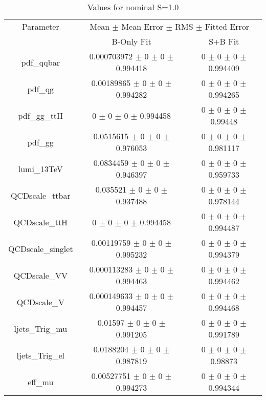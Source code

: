 \begin{table}
\centering
\caption{Values for nominal S=1.0}
\begin{tabular}{ccc}
\toprule
Parameter & \multicolumn{2}{c}{Mean $\pm$ Mean Error $\pm$ RMS $\pm$ Fitted Error}\\
 & B-Only Fit & S+B Fit\\
\midrule
pdf\_qqbar & \num{0.000703972} $\pm$ \num{0} $\pm$ \num{0} $\pm$ \num{0.994418} & \num{0} $\pm$ \num{0} $\pm$ \num{0} $\pm$ \num{0.994409}\\
pdf\_qg & \num{0.00189865} $\pm$ \num{0} $\pm$ \num{0} $\pm$ \num{0.994282} & \num{0} $\pm$ \num{0} $\pm$ \num{0} $\pm$ \num{0.994265}\\
pdf\_gg\_ttH & \num{0} $\pm$ \num{0} $\pm$ \num{0} $\pm$ \num{0.994458} & \num{0} $\pm$ \num{0} $\pm$ \num{0} $\pm$ \num{0.99448}\\
pdf\_gg & \num{0.0515615} $\pm$ \num{0} $\pm$ \num{0} $\pm$ \num{0.976053} & \num{0} $\pm$ \num{0} $\pm$ \num{0} $\pm$ \num{0.981117}\\
lumi\_13TeV & \num{0.0834459} $\pm$ \num{0} $\pm$ \num{0} $\pm$ \num{0.946397} & \num{0} $\pm$ \num{0} $\pm$ \num{0} $\pm$ \num{0.959733}\\
QCDscale\_ttbar & \num{0.035521} $\pm$ \num{0} $\pm$ \num{0} $\pm$ \num{0.937488} & \num{0} $\pm$ \num{0} $\pm$ \num{0} $\pm$ \num{0.978144}\\
QCDscale\_ttH & \num{0} $\pm$ \num{0} $\pm$ \num{0} $\pm$ \num{0.994458} & \num{0} $\pm$ \num{0} $\pm$ \num{0} $\pm$ \num{0.994487}\\
QCDscale\_singlet & \num{0.00119759} $\pm$ \num{0} $\pm$ \num{0} $\pm$ \num{0.995232} & \num{0} $\pm$ \num{0} $\pm$ \num{0} $\pm$ \num{0.994379}\\
QCDscale\_VV & \num{0.000113283} $\pm$ \num{0} $\pm$ \num{0} $\pm$ \num{0.994463} & \num{0} $\pm$ \num{0} $\pm$ \num{0} $\pm$ \num{0.994462}\\
QCDscale\_V & \num{0.000149633} $\pm$ \num{0} $\pm$ \num{0} $\pm$ \num{0.994457} & \num{0} $\pm$ \num{0} $\pm$ \num{0} $\pm$ \num{0.994468}\\
ljets\_Trig\_mu & \num{0.01597} $\pm$ \num{0} $\pm$ \num{0} $\pm$ \num{0.991205} & \num{0} $\pm$ \num{0} $\pm$ \num{0} $\pm$ \num{0.991789}\\
ljets\_Trig\_el & \num{0.0188204} $\pm$ \num{0} $\pm$ \num{0} $\pm$ \num{0.987819} & \num{0} $\pm$ \num{0} $\pm$ \num{0} $\pm$ \num{0.98873}\\
eff\_mu & \num{0.00527751} $\pm$ \num{0} $\pm$ \num{0} $\pm$ \num{0.994273} & \num{0} $\pm$ \num{0} $\pm$ \num{0} $\pm$ \num{0.994344}\\

\end{tabular}
\end{table}
